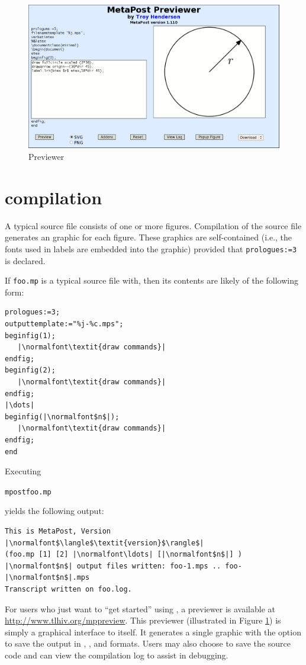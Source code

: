 \begin{figure}[tp]
  \centering
  \includegraphics[width=\textwidth]{previewer}
  \caption{\MP{} Previewer}
  \label{fig:previewer}
\end{figure}

\section{\MP{} compilation}
\label{sec:mpcompilation}

A typical \MP{} source file consists of one or more figures.
Compilation of the source file generates an \EPS{} graphic for each
figure.  These \EPS{} graphics are self-contained (i.e., the fonts used
in labels are embedded into the graphic) provided that
\lstinline{prologues:=3} is declared.

If \texttt{foo.mp} is a typical \MP{} source file with, then its
contents are likely of the following form:

\begin{lstlisting}[xleftmargin=1.25\parindent]
prologues:=3;
outputtemplate:="%j-%c.mps";
beginfig(1);
   |\normalfont\textit{draw commands}|
endfig;
beginfig(2);
   |\normalfont\textit{draw commands}|
endfig;
|\dots|
beginfig(|\normalfont$n$|);
   |\normalfont\textit{draw commands}|
endfig;
end
\end{lstlisting}

Executing
\begin{flushleft}
  \hspace*{1.25\parindent}\texttt{mpostfoo.mp}
\end{flushleft}
 yields the following output:

\begin{lstlisting}[xleftmargin=1.25\parindent]
This is MetaPost, Version |\normalfont$\langle$\textit{version}$\rangle$|
(foo.mp [1] [2] |\normalfont\ldots| [|\normalfont$n$|] )
|\normalfont$n$| output files written: foo-1.mps .. foo-|\normalfont$n$|.mps
Transcript written on foo.log.
\end{lstlisting}

For users who just want to ``get started'' using \MP{}, a \MP{}
previewer is available at \url{http://www.tlhiv.org/mppreview}.  This
previewer (illustrated in Figure \ref{fig:previewer}) is simply a
graphical interface to \MP{} itself.  It generates a single graphic with
the option to save the output in \EPS{}, \PDF{}, and \SVG{} formats.
Users may also choose to save the source code and can view the
compilation log to assist in debugging.

